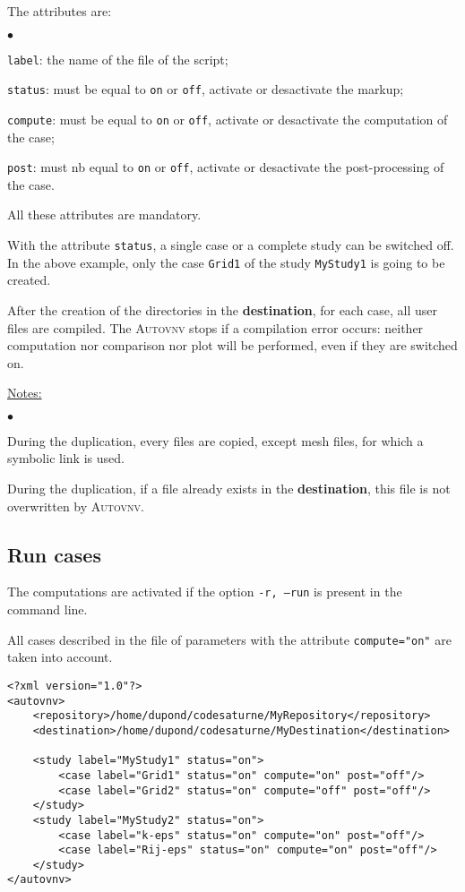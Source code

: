 \documentclass[a4paper,10pt,twoside]{csshortdoc}
\begin{document}
The attributes are:
\begin{list}{$\bullet$}{}
\item \texttt{label}: the name of the file of the script;
\item \texttt{status}: must be equal to \texttt{on} or \texttt{off},
activate or desactivate the markup;
\item \texttt{compute}: must be equal to \texttt{on} or \texttt{off},
activate or desactivate the computation of the case;
\item \texttt{post}: must nb equal to \texttt{on} or \texttt{off},
activate or desactivate the post-processing of the case.
\end{list}

All these attributes are mandatory.

With the attribute \texttt{status}, a single case or a complete study can be
switched off. In the above example, only the case \texttt{Grid1} of the study
\texttt{MyStudy1} is going to be created.

After the creation of the directories in the \textbf{destination}, for each
case, all user files are compiled. The \textsc{Autovnv} stops if a compilation
error occurs: neither computation nor comparison nor plot will be performed,
even if they are switched on.

\underline{Notes:}

\begin{list}{$\bullet$}{}
\item During the duplication, every files are copied, except mesh files, for
which a symbolic link is used.
\item During the duplication, if a file already exists in the
\textbf{destination}, this file is not overwritten by \textsc{Autovnv}.
\end{list}


\subsection{Run cases}

The computations are activated if the option \texttt{-r, --run} is present in
the command line.

All cases described in the file of parameters with the attribute
\texttt{compute="on"} are taken into account.

\small
\begin{verbatim}
<?xml version="1.0"?>
<autovnv>
    <repository>/home/dupond/codesaturne/MyRepository</repository>
    <destination>/home/dupond/codesaturne/MyDestination</destination>

    <study label="MyStudy1" status="on">
        <case label="Grid1" status="on" compute="on" post="off"/>
        <case label="Grid2" status="on" compute="off" post="off"/>
    </study>
    <study label="MyStudy2" status="on">
        <case label="k-eps" status="on" compute="on" post="off"/>
        <case label="Rij-eps" status="on" compute="on" post="off"/>
    </study>
</autovnv>
\end{verbatim}
\normalsize
\end{document}
